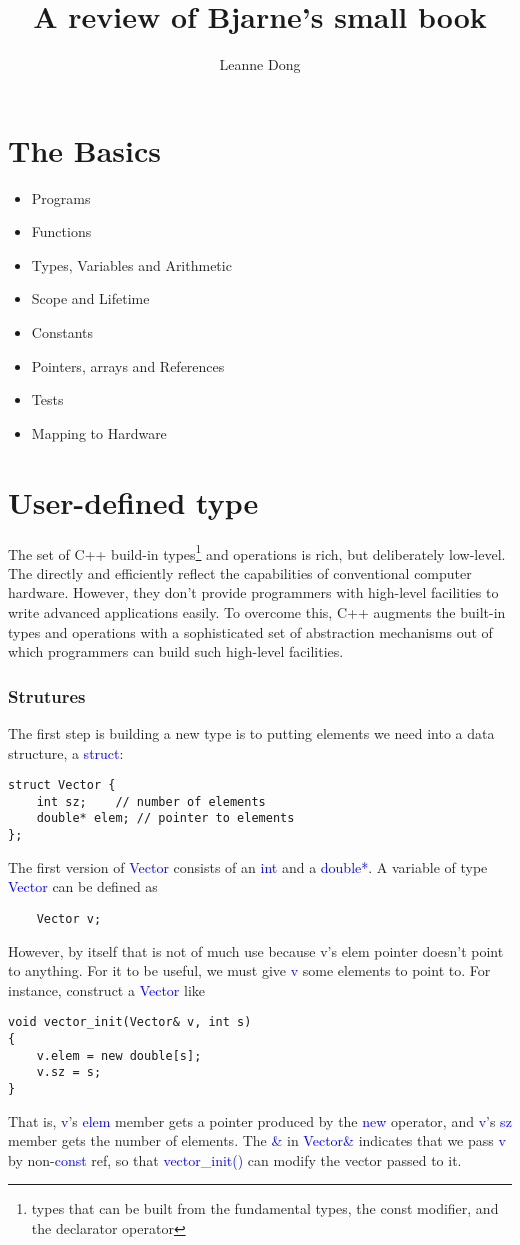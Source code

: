\documentclass{article}
\title{A review of Bjarne's small book}
\author{Leanne Dong}
\newcommand{\be}[1]{\textcolor{blue}{#1}}
\begin{document}
	\maketitle
	\tableofcontents
\section{The Basics}
\begin{itemize}
	\item Programs
	\item Functions
	\item Types, Variables and Arithmetic
	\item Scope and Lifetime
	\item Constants
	\item Pointers, arrays and References
	\item Tests
	\item Mapping to Hardware
\end{itemize}
\section{User-defined type}
The set of C++ build-in types\footnote{types that can be built from the fundamental types, the const modifier, and the declarator operator} and operations is rich, but deliberately low-level. The directly and efficiently reflect the capabilities of conventional computer hardware. However, they don't provide programmers with high-level facilities to write advanced applications easily. To overcome this, C++ augments the built-in types and operations with a sophisticated set of abstraction mechanisms out of which programmers can build such high-level facilities.

\subsubsection{Strutures}

The first step is building a new type is to putting elements we need into a data structure, a \be{struct}:

\begin{verbatim}
struct Vector {
    int sz;    // number of elements
    double* elem; // pointer to elements
};	
\end{verbatim}
The first version of \be{Vector} consists of an \be{int} and a \be{double*}. A variable of type \be{Vector} can be defined as 
\begin{verbatim}
	Vector v;
\end{verbatim}
However, by itself that is not of much use because v's elem pointer doesn't point to anything. For it to be useful, we must give \be{v} some elements to point to. For instance, construct a \be{Vector} like
\begin{verbatim}
void vector_init(Vector& v, int s)
{
    v.elem = new double[s];
    v.sz = s;
}	
\end{verbatim}
That is, \be{v}'s \be{elem} member gets a pointer produced by the \be{new} operator, and \be{v}'s \be{sz} member gets the number of elements. The \be{\&} in \be{Vector\&} indicates that we pass \be{v} by non-\be{const} ref, so that \be{vector\_init()} can modify the vector passed to it.
\end{document}
